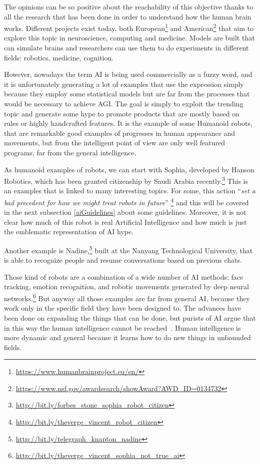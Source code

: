The opinions can be so positive about the reachability of this objective thanks to all the research that has been done in order to understand how the human brain works. Different projects exist today, both European\footnote{\url{https://www.humanbrainproject.eu/en/}} and American\footnote{\url{https://www.nsf.gov/awardsearch/showAward?AWD\_ID=0134732}} that aim to explore this topic in neuroscience, computing and medicine. Models are built that can simulate brains and researchers can use them to do experiments in different fields: robotics, medicine, cognition.

However, nowadays the term AI is being used commercially as a fuzzy word, and it is unfortunately generating a lot of examples that use the expression simply because they employ some statistical models but are far from the processes that would be necessary to achieve AGI. The goal is simply to exploit the trending topic and generate some hype to promote products that are mostly based on rules or highly handcrafted features. It is the example of some Humanoid robots, that are remarkable good examples of progresses in human appearance and movements, but from the intelligent point of view are only well featured programs, far from the general intelligence.

As humanoid examples of robots, we can start with Sophia, developed by Hanson Robotics, which has been granted citizenship by Saudi Arabia recently.\footnote{\url{http://bit.ly/forbes_stone_sophia_robot_citizen}} This is an examples that is linked to many interesting topics. For some, this action ``\textit{set a bad precedent for how we might treat robots in future}'' \footnote{\url{http://bit.ly/theverge_vincent_robot_citizen}} and this will be covered in the next subsection \ref{aiGuidelines} about some guidelines. Moreover, it is not clear how much of this robot is real Artificial Intelligence and how much is just the emblematic representation of AI hype.

Another example is Nadine,\footnote{\url{http://bit.ly/telegraph_knapton_nadine}} built at the Nanyang Technological University, that is able to recognize people and resume conversations based on previous chats.

Those kind of robots are a combination of a wide number of AI methods: face tracking, emotion recognition, and robotic movements generated by deep neural networks.\footnote{\url{http://bit.ly/theverge_vincent_sophia_not_true_ai}} But anyway all those examples are far from general AI, because they work only in the specific field they have been designed to. The advances have been done on expanding the things that can be done, but purists of AI argue that in this way the human intelligence cannot be reached~\cite{pearl2018theoretical}. Human intelligence is more dynamic and general because it learns how to do new things in unbounded fields.

